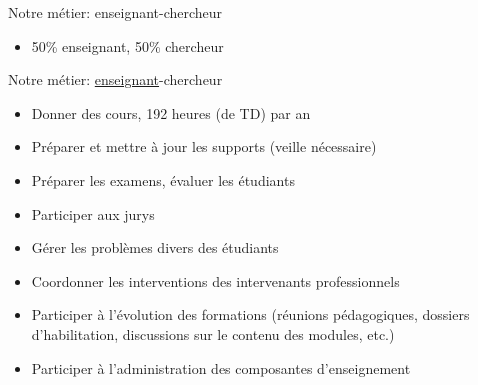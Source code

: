 \documentclass[10pt,final,usepdftitle=false]{beamer}
\author{M. Quinson\\[0.5em]
  \small  (merci à \textbf{L. Nussbaum} pour la plupart de ces transparents)\\[0.5em]
  \url{https://github.com/mquinson/slides-sem}} \date{} \usepackage{eurosym}
\begin{document}
\frame{\titlepage}

\begin{frame}{Notre métier: enseignant-chercheur}
\begin{itemize}
\item 50\% enseignant, 50\% chercheur
\end{itemize}
\end{frame}

\begin{frame}{Notre métier: \underline{enseignant}-chercheur}
\begin{itemize}
\item Donner des cours, 192 heures (de TD) par an
\item Préparer et mettre à jour les supports (veille nécessaire)
\item Préparer les examens, évaluer les étudiants
\item Participer aux jurys
\item Gérer les problèmes divers des étudiants
\item Coordonner les interventions des intervenants professionnels
\item Participer à l'évolution des formations (réunions pédagogiques, dossiers
  d'habilitation, discussions sur le contenu des modules, etc.)
\item Participer à l'administration des composantes d'enseignement
\end{itemize}
\end{frame}
\end{document}
